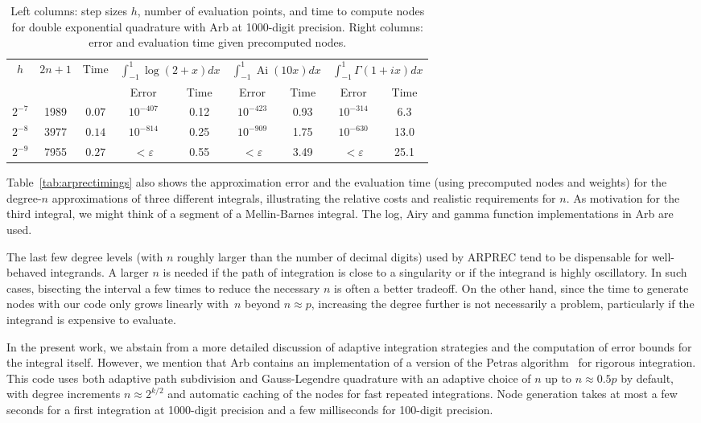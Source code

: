 \documentclass{siamart0216}
\begin{document}
\begin{table}[h!]
\begin{centering}
\begin{tabular}{ c c c | c c | c c | c c }
$h$ & $2n+1$ & Time &
    \multicolumn{2}{|c|}{$\int_{-1}^{1}\!\log(2\!+\!x) dx$} &
    \multicolumn{2}{|c|}{$\int_{-1}^{1}\!\operatorname{Ai}(10 x) dx$} &
    \multicolumn{2}{|c}{$\int_{-1}^{1}\!\Gamma(1\!+\!ix) dx$} \\ 
   &         &          & Error   & Time      &  Error & Time  &  Error & Time \\ \hline
\rule{0pt}{3ex}$2^{-7}$ & 1989 & $0.07$ & $10^{-407}$ & 0.12 & $10^{-423}$ & 0.93 & $10^{-314}$ & 6.3 \\
$2^{-8}$ & 3977 & $0.14$ & $10^{-814}$ & 0.25 & $10^{-909}$ & 1.75 & $10^{-630}$ & 13.0 \\
$2^{-9}$ & 7955 & $0.27$ & $<\varepsilon$ & 0.55 & $<\varepsilon$ & 3.49 & $<\varepsilon$ & 25.1
\end{tabular}
\caption{Left columns: step sizes $h$, number of evaluation
points, and time to compute nodes for double exponential quadrature with Arb
at 1000-digit precision. Right columns: error and evaluation
time given precomputed nodes.}
\label{tab:dequad}
\end{centering}
\end{table}

Table~\ref{tab:arprectimings} also
shows the approximation error
and the evaluation time (using precomputed nodes and weights)
for the degree-$n$ approximations of three different integrals,
illustrating the relative costs and realistic requirements for $n$.
As motivation for the third integral, we might think
of a segment of a Mellin-Barnes integral.
The log, Airy and gamma function implementations in Arb are used.

The last few degree levels (with $n$ roughly larger than
the number of decimal digits) used by ARPREC
tend to be dispensable for well-behaved integrands.
A larger $n$ is needed if the path of integration
is close to a singularity or if the integrand is highly oscillatory.
In such cases, bisecting the interval a few times
to reduce the necessary $n$ is often a better tradeoff.
On the other hand, since the time to generate nodes with our code only
grows linearly with~$n$ beyond $n \approx p$,
increasing the degree further is not necessarily a problem,
particularly if the integrand is expensive to evaluate.

In the present work, we abstain from a more detailed discussion of
adaptive integration strategies and the computation
of error bounds for the integral itself.
However, we mention that Arb contains an implementation of a
version of the Petras algorithm~\cite{petras2002self} for rigorous
integration. This code uses both adaptive path subdivision
and Gauss-Legendre quadrature with an adaptive choice of $n$ up to
$n \approx 0.5p$ by default, with degree increments
$n \approx 2^{k/2}$ and automatic caching of the nodes
for fast repeated integrations.
Node generation takes at most a few seconds for a first integration
at 1000-digit precision
and a few milliseconds for 100-digit precision.
\end{document}
